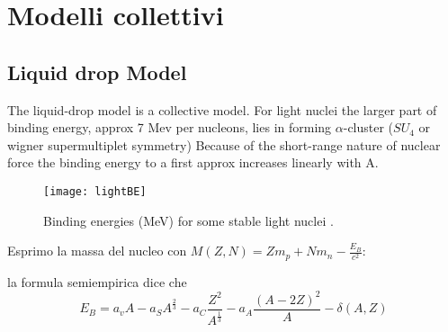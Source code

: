 \chapter{Modelli collettivi}

\section{Liquid drop Model}

The liquid-drop model is a collective model.
For light nuclei the larger part of binding energy, approx 7 Mev per nucleons, lies in forming $\alpha$-cluster ($SU_4$ or wigner supermultiplet symmetry) 
Because of the short-range nature of nuclear force the binding energy to a first approx increases linearly with A.

\begin{figure}[!ht]
\centering
\texttt{[image: lightBE]}
\caption{Binding energies (MeV) for some stable light nuclei
.}
\end{figure}

Esprimo la massa del nucleo con $M(Z,N)=Zm_p+Nm_n-\frac{E_B}{c^2}$:

la formula semiempirica dice che
\begin{equation*}
E_B=a_vA-a_SA^{\frac{2}{3}}-a_C\frac{Z^2}{A^{\frac{1}{3}}}-a_A\frac{(A-2Z)^2}{A}-\delta(A,Z)
\end{equation*}


